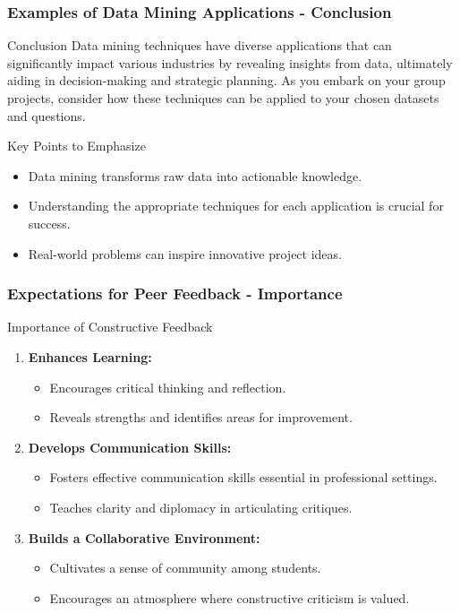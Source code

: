 \documentclass{beamer}
\begin{document}
\begin{frame}[fragile]
    \frametitle{Examples of Data Mining Applications - Conclusion}
    \begin{block}{Conclusion}
        Data mining techniques have diverse applications that can significantly impact various industries by revealing insights from data, ultimately aiding in decision-making and strategic planning. 
        As you embark on your group projects, consider how these techniques can be applied to your chosen datasets and questions.
    \end{block}

    \begin{block}{Key Points to Emphasize}
        \begin{itemize}
            \item Data mining transforms raw data into actionable knowledge.
            \item Understanding the appropriate techniques for each application is crucial for success.
            \item Real-world problems can inspire innovative project ideas.
        \end{itemize}
    \end{block}
\end{frame}

\begin{frame}[fragile]
    \frametitle{Expectations for Peer Feedback - Importance}
    \begin{block}{Importance of Constructive Feedback}
        \begin{enumerate}
            \item \textbf{Enhances Learning:}
            \begin{itemize}
                \item Encourages critical thinking and reflection.
                \item Reveals strengths and identifies areas for improvement.
            \end{itemize}
            \item \textbf{Develops Communication Skills:}
            \begin{itemize}
                \item Fosters effective communication skills essential in professional settings.
                \item Teaches clarity and diplomacy in articulating critiques.
            \end{itemize}
            \item \textbf{Builds a Collaborative Environment:}
            \begin{itemize}
                \item Cultivates a sense of community among students.
                \item Encourages an atmosphere where constructive criticism is valued.
            \end{itemize}
        \end{enumerate}
    \end{block}
\end{frame}
\end{document}
